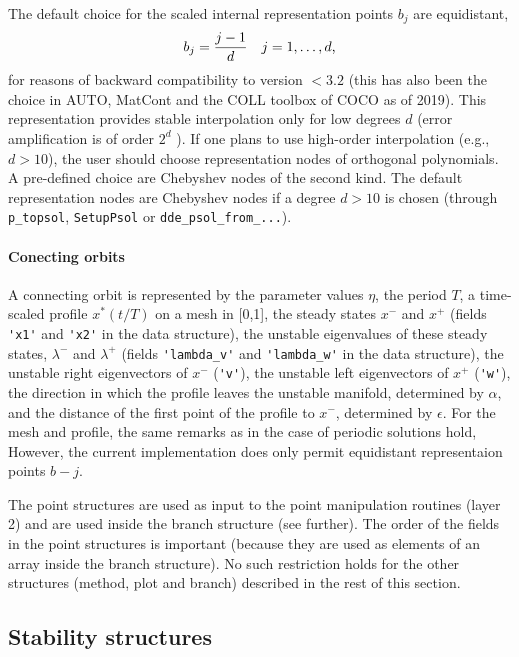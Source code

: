 \documentclass[10pt]{scrartcl}
\newcommand{\blist}[1]{\mbox{\lstinline!#1!}}
\begin{document}
The default choice for the scaled internal representation points $b_j$ are equidistant,
\begin{displaymath}
  b_j=\frac{j-1}{d}\mbox{\quad $j=1,\ldots,d$,}
\end{displaymath}
for reasons of backward compatibility to version $<3.2$ (this has also
been the choice in AUTO, MatCont and the COLL toolbox of \textsc{COCO}
as of 2019). This representation provides stable interpolation only
for low degrees $d$ (error amplification is of order $2^d$
\cite{berrut2004}). If one plans to use high-order interpolation
(e.g., $d>10$), the user should choose representation nodes of
orthogonal polynomials. A pre-defined choice are Chebyshev nodes of
the second kind. The default representation nodes are Chebyshev nodes
if a degree $d>10$ is chosen (through \blist{p_topsol},
\blist{SetupPsol} or \blist{dde_psol_from_...}).


\paragraph{Conecting orbits}
A connecting orbit is represented by the parameter values $\eta$, the
period $T$, a time-scaled profile $x^*(t/T)$ on a mesh in [0,1], the
steady states $x^-$ and $x^+$ (fields \blist{'x1'} and \blist{'x2'} in
the data structure), the unstable eigenvalues of these steady states,
$\lambda^-$ and $\lambda^+$ (fields \blist{'lambda_v'} and
\blist{'lambda_w'} in the data structure), the unstable right
eigenvectors of $x^-$ (\blist{'v'}), the unstable left eigenvectors of
$x^+$ (\blist{'w'}), the direction in which the profile leaves the
unstable manifold, determined by $\alpha$, and the distance of the
first point of the profile to $x^-$, determined by $\epsilon$.  For
the mesh and profile, the same remarks as in the case of periodic
solutions hold, However, the current implementation does only permit
equidistant representaion points $b-j$.

The point structures are used as input to the point
manipulation routines (layer 2) and are used inside
the branch structure (see further). The order of the fields in the point 
structures is important (because they are used as elements
of an array inside the branch structure).
No such restriction holds for the other structures (method, plot and
branch) described in the rest of this section.

\subsection{Stability structures}\label{sec:stab:struct}
\end{document}
